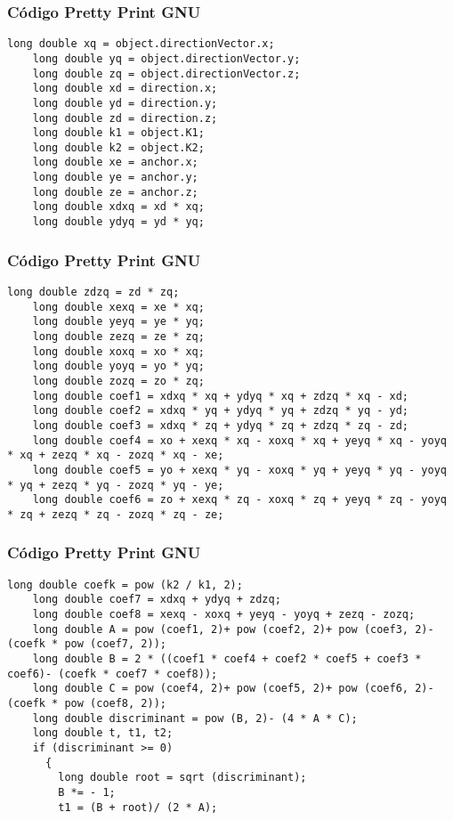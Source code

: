 \documentclass{beamer}
\begin{document}
\begin{frame}[fragile]
\frametitle{C\'odigo Pretty Print GNU}
\begin{lstlisting}[style=CStyle]
    long double xq = object.directionVector.x;
    long double yq = object.directionVector.y;
    long double zq = object.directionVector.z;
    long double xd = direction.x;
    long double yd = direction.y;
    long double zd = direction.z;
    long double k1 = object.K1;
    long double k2 = object.K2;
    long double xe = anchor.x;
    long double ye = anchor.y;
    long double ze = anchor.z;
    long double xdxq = xd * xq;
    long double ydyq = yd * yq;
\end{lstlisting}
\end{frame}
\begin{frame}[fragile]
\frametitle{C\'odigo Pretty Print GNU}
\begin{lstlisting}[style=CStyle]
    long double zdzq = zd * zq;
    long double xexq = xe * xq;
    long double yeyq = ye * yq;
    long double zezq = ze * zq;
    long double xoxq = xo * xq;
    long double yoyq = yo * yq;
    long double zozq = zo * zq;
    long double coef1 = xdxq * xq + ydyq * xq + zdzq * xq - xd;
    long double coef2 = xdxq * yq + ydyq * yq + zdzq * yq - yd;
    long double coef3 = xdxq * zq + ydyq * zq + zdzq * zq - zd;
    long double coef4 = xo + xexq * xq - xoxq * xq + yeyq * xq - yoyq * xq + zezq * xq - zozq * xq - xe;
    long double coef5 = yo + xexq * yq - xoxq * yq + yeyq * yq - yoyq * yq + zezq * yq - zozq * yq - ye;
    long double coef6 = zo + xexq * zq - xoxq * zq + yeyq * zq - yoyq * zq + zezq * zq - zozq * zq - ze;
\end{lstlisting}
\end{frame}
\begin{frame}[fragile]
\frametitle{C\'odigo Pretty Print GNU}
\begin{lstlisting}[style=CStyle]
    long double coefk = pow (k2 / k1, 2);
    long double coef7 = xdxq + ydyq + zdzq;
    long double coef8 = xexq - xoxq + yeyq - yoyq + zezq - zozq;
    long double A = pow (coef1, 2)+ pow (coef2, 2)+ pow (coef3, 2)- (coefk * pow (coef7, 2));
    long double B = 2 * ((coef1 * coef4 + coef2 * coef5 + coef3 * coef6)- (coefk * coef7 * coef8));
    long double C = pow (coef4, 2)+ pow (coef5, 2)+ pow (coef6, 2)- (coefk * pow (coef8, 2));
    long double discriminant = pow (B, 2)- (4 * A * C);
    long double t, t1, t2;
    if (discriminant >= 0)
      {
        long double root = sqrt (discriminant);
        B *= - 1;
        t1 = (B + root)/ (2 * A);
\end{lstlisting}
\end{frame}
\end{document}
